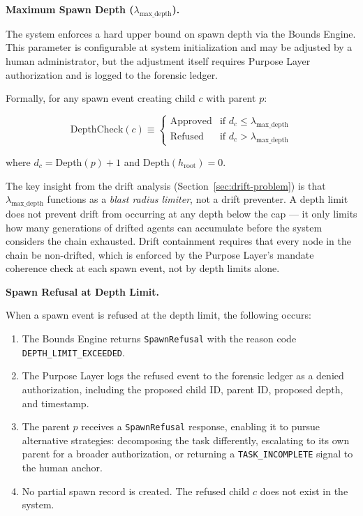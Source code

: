 \bigskip
\noindent\textbf{Maximum Spawn Depth ($\lambda_{\text{max\_depth}}$).}

The system enforces a hard upper bound on spawn depth via the Bounds Engine. This parameter is configurable at system initialization and may be adjusted by a human administrator, but the adjustment itself requires Purpose Layer authorization and is logged to the forensic ledger.

Formally, for any spawn event creating child $c$ with parent $p$:

\begin{equation}
    \text{DepthCheck}(c) \equiv 
    \begin{cases}
    \text{Approved} & \text{if } d_c \leq \lambda_{\text{max\_depth}} \\
    \text{Refused} & \text{if } d_c > \lambda_{\text{max\_depth}}
    \end{cases}
\end{equation}

where $d_c = \text{Depth}(p) + 1$ and $\text{Depth}(h_{\text{root}}) = 0$.

The key insight from the drift analysis (Section~\ref{sec:drift-problem}) is that $\lambda_{\text{max\_depth}}$ functions as a \textit{blast radius limiter}, not a drift preventer. A depth limit does not prevent drift from occurring at any depth below the cap — it only limits how many generations of drifted agents can accumulate before the system considers the chain exhausted. Drift containment requires that every node in the chain be non-drifted, which is enforced by the Purpose Layer's mandate coherence check at each spawn event, not by depth limits alone.

\bigskip
\noindent\textbf{Spawn Refusal at Depth Limit.}

When a spawn event is refused at the depth limit, the following occurs:

\begin{enumerate}
    \item The Bounds Engine returns \texttt{SpawnRefusal} with the reason code \texttt{DEPTH\_LIMIT\_EXCEEDED}.
    \item The Purpose Layer logs the refused event to the forensic ledger as a denied authorization, including the proposed child ID, parent ID, proposed depth, and timestamp.
    \item The parent $p$ receives a \texttt{SpawnRefusal} response, enabling it to pursue alternative strategies: decomposing the task differently, escalating to its own parent for a broader authorization, or returning a \texttt{TASK\_INCOMPLETE} signal to the human anchor.
    \item No partial spawn record is created. The refused child $c$ does not exist in the system.
\end{enumerate}

